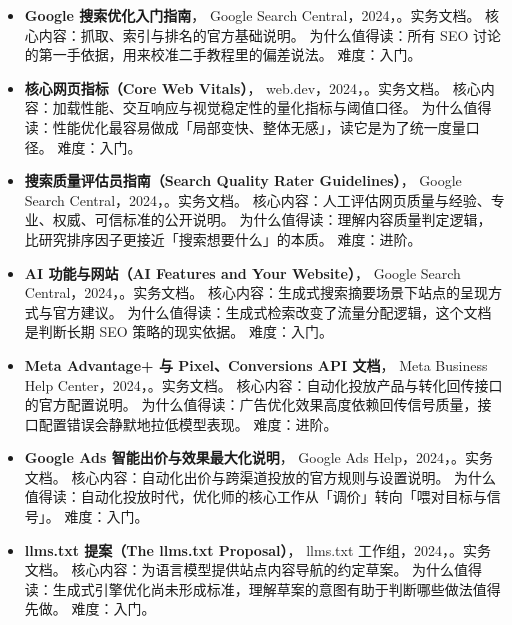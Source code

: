 \begin{itemize}
        Schema.org 社区组，2024，\cite{schemaorg}。实务文档。
        核心内容：商品、评价、面包屑等结构化标记的标准词表。
        为什么值得读：站内结构化数据是搜索与生成式摘要的基础设施，字段选错等于白做。
        难度：入门。
  \item \textbf{Google 搜索优化入门指南}，
        Google Search Central，2024，\cite{google2024seostarter}。实务文档。
        核心内容：抓取、索引与排名的官方基础说明。
        为什么值得读：所有 SEO 讨论的第一手依据，用来校准二手教程里的偏差说法。
        难度：入门。
  \item \textbf{核心网页指标（Core Web Vitals）}，
        web.dev，2024，\cite{google2024corewebvitals}。实务文档。
        核心内容：加载性能、交互响应与视觉稳定性的量化指标与阈值口径。
        为什么值得读：性能优化最容易做成「局部变快、整体无感」，读它是为了统一度量口径。
        难度：入门。
  \item \textbf{搜索质量评估员指南（Search Quality Rater Guidelines）}，
        Google Search Central，2024，\cite{google2024quality}。实务文档。
        核心内容：人工评估网页质量与经验、专业、权威、可信标准的公开说明。
        为什么值得读：理解内容质量判定逻辑，比研究排序因子更接近「搜索想要什么」的本质。
        难度：进阶。
  \item \textbf{AI 功能与网站（AI Features and Your Website）}，
        Google Search Central，2024，\cite{google2024ai_overviews}。实务文档。
        核心内容：生成式搜索摘要场景下站点的呈现方式与官方建议。
        为什么值得读：生成式检索改变了流量分配逻辑，这个文档是判断长期 SEO 策略的现实依据。
        难度：入门。
  \item \textbf{Meta Advantage+ 与 Pixel、Conversions API 文档}，
        Meta Business Help Center，2024，\cite{meta_advantage}。实务文档。
        核心内容：自动化投放产品与转化回传接口的官方配置说明。
        为什么值得读：广告优化效果高度依赖回传信号质量，接口配置错误会静默地拉低模型表现。
        难度：进阶。
  \item \textbf{Google Ads 智能出价与效果最大化说明}，
        Google Ads Help，2024，\cite{googleads_help}。实务文档。
        核心内容：自动化出价与跨渠道投放的官方规则与设置说明。
        为什么值得读：自动化投放时代，优化师的核心工作从「调价」转向「喂对目标与信号」。
        难度：入门。
  \item \textbf{llms.txt 提案（The llms.txt Proposal）}，
        llms.txt 工作组，2024，\cite{openaillmstxt}。实务文档。
        核心内容：为语言模型提供站点内容导航的约定草案。
        为什么值得读：生成式引擎优化尚未形成标准，理解草案的意图有助于判断哪些做法值得先做。
        难度：入门。
\end{itemize}

